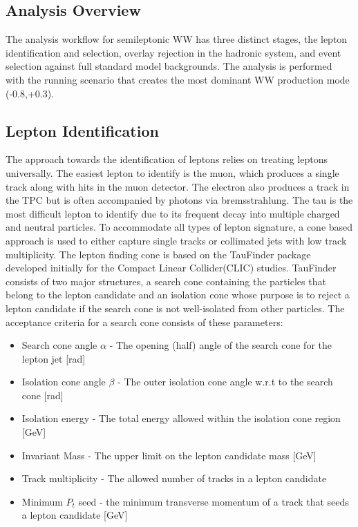 \subsection{Analysis Overview}
\label{subsec:ana_overview}

The analysis workflow for semileptonic WW has three distinct stages, the lepton identification and selection, overlay rejection in the hadronic system, and event selection against full standard model backgrounds. The analysis is performed with the  running scenario that creates the most dominant WW production mode (-0.8,+0.3). 


\subsection{Lepton Identification}
\label{subsec:Lepton_ID}
The approach towards the identification of leptons relies on treating leptons universally. The easiest lepton to identify is the muon, which produces a single track along with hits in the muon detector. The electron also produces a track in the TPC but is often accompanied by photons via bremsstrahlung. The tau is the most difficult lepton to identify due to its frequent decay into multiple charged and neutral particles. To accommodate all types of lepton signature, a cone based approach is used to either capture single tracks or collimated jets with low track multiplicity. The lepton finding cone is based on the TauFinder package \cite{taufinder} developed initially for the Compact Linear Collider(CLIC) studies. TauFinder consists of two major structures, a search cone containing the particles that belong to the lepton candidate and an isolation cone whose purpose is to reject a lepton candidate if the search cone is not well-isolated from other particles. The acceptance criteria for a search cone consists of these parameters:
\begin{itemize}
\item Search cone angle $\alpha$ - The opening (half) angle of the search cone for the lepton jet [rad]
\item Isolation cone angle $\beta$ - The outer isolation cone angle w.r.t to the search cone [rad]
\item Isolation energy - The total energy allowed within the isolation cone region [GeV]
\item Invariant Mass - The upper limit on the lepton candidate mass [GeV]
\item Track multiplicity - The allowed number of tracks in a lepton candidate
\item Minimum $P_t$ seed - the minimum transverse momentum of a track that seeds a lepton candidate [GeV] 
\end{itemize}
